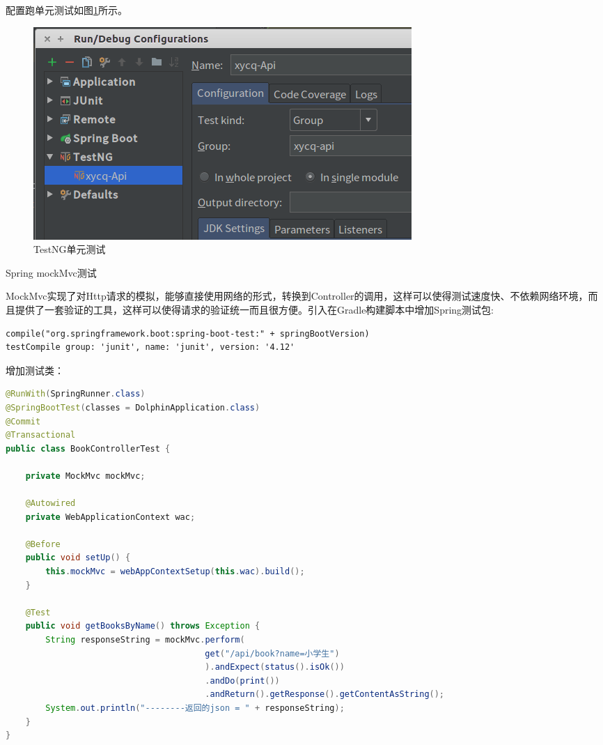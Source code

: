 \documentclass[12pt]{book}
\makeatletter
\numberwithin{dummy}{section}
\theoremstyle{ocrenumbox}
\theoremstyle{blacknumex}
\theoremstyle{blacknumbox}
\theoremstyle{ocrenum}
\renewcommand{\subsection}{\@startsection {subsection}{2}{\z@}
	{-3ex \@plus -0.1ex \@minus -.4ex}
	{0.5ex \@plus.2ex }
	{\normalfont\sffamily\bfseries}}
\newlength\esp
\makeatother
\begin{document}
配置跑单元测试如图\ref{fig:testngunittestbygroup}所示。

\begin{figure}[htbp]
	\centering
	\includegraphics[scale=0.5]{testngunittestbygroup.png}
	\caption{TestNG单元测试}
	\label{fig:testngunittestbygroup}
\end{figure}

\subsection{Spring mockMvc测试}

MockMvc实现了对Http请求的模拟，能够直接使用网络的形式，转换到Controller的调用，这样可以使得测试速度快、不依赖网络环境，而且提供了一套验证的工具，这样可以使得请求的验证统一而且很方便。引入在Gradle构建脚本中增加Spring测试包:

\begin{lstlisting}
compile("org.springframework.boot:spring-boot-test:" + springBootVersion)
testCompile group: 'junit', name: 'junit', version: '4.12'
\end{lstlisting}

增加测试类：

\begin{lstlisting}[language=Java]
@RunWith(SpringRunner.class)
@SpringBootTest(classes = DolphinApplication.class)
@Commit
@Transactional
public class BookControllerTest {

	private MockMvc mockMvc;
	
	@Autowired
	private WebApplicationContext wac;
	
	@Before
	public void setUp() {
		this.mockMvc = webAppContextSetup(this.wac).build();
	}
	
	@Test
	public void getBooksByName() throws Exception {
		String responseString = mockMvc.perform(
										get("/api/book?name=小学生")
										).andExpect(status().isOk())    
										.andDo(print())         
										.andReturn().getResponse().getContentAsString();
		System.out.println("--------返回的json = " + responseString);
	}
}
\end{lstlisting}
\end{document}
